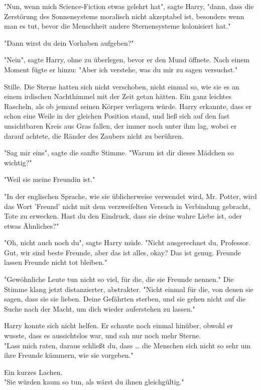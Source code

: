 {"Nun, wenn mich Science-Fiction etwas gelehrt hat", sagte Harry, "dann, dass die Zerstörung des Sonnensystems moralisch nicht akzeptabel ist, besonders wenn man es tut, bevor die Menschheit andere Sternensysteme kolonisiert hat."

"Dann wirst du dein Vorhaben aufgeben?"

"Nein", sagte Harry, ohne zu überlegen, bevor er den Mund öffnete. Nach einem Moment fügte er hinzu: "Aber ich verstehe, was du mir zu sagen versuchst."

Stille. Die Sterne hatten sich nicht verschoben, nicht einmal so, wie sie es an einem irdischen Nachthimmel mit der Zeit getan hätten. Ein ganz leichtes Rascheln, als ob jemand seinen Körper verlagern würde. Harry erkannte, dass er schon eine Weile in der gleichen Position stand, und ließ sich auf den fast unsichtbaren Kreis aus Gras fallen, der immer noch unter ihm lag, wobei er darauf achtete, die Ränder des Zaubers nicht zu berühren.

"Sag mir eins", sagte die sanfte Stimme. "Warum ist dir dieses Mädchen so wichtig?"

"Weil sie meine Freundin ist."

"In der englischen Sprache, wie sie üblicherweise verwendet wird, Mr. Potter, wird das Wort 'Freund' nicht mit dem verzweifelten Versuch in Verbindung gebracht, Tote zu erwecken. Hast du den Eindruck, dass sie deine wahre Liebe ist, oder etwas Ähnliches?"

"Oh, nicht auch noch du", sagte Harry müde. "Nicht ausgerechnet du, Professor. Gut, wir sind beste Freunde, aber das ist alles, okay? Das ist genug. Freunde lassen Freunde nicht tot bleiben."

"Gewöhnliche Leute tun nicht so viel, für die, die sie Freunde nennen." Die Stimme klang jetzt distanzierter, abstrakter. "Nicht einmal für die, von denen sie sagen, dass sie sie lieben. Deine Gefährten sterben, und sie gehen nicht auf die Suche nach der Macht, um dich wieder auferstehen zu lassen."

Harry konnte sich nicht helfen. Er schaute noch einmal hinüber, obwohl er wusste, dass es aussichtslos war, und sah nur noch mehr Sterne.\\ "Lass mich raten, daraus schließt du, dass … die Menschen sich nicht so sehr um ihre Freunde kümmern, wie sie vorgeben."

Ein kurzes Lachen.\\ "Sie würden kaum so tun, als wärst du ihnen gleichgültig."

}
